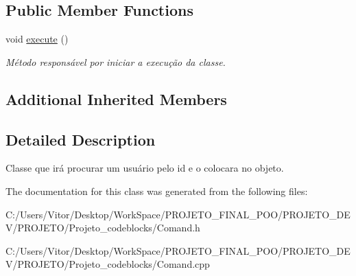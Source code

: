 \subsection*{Public Member Functions}
\begin{DoxyCompactItemize}
\item 
\hypertarget{class_command_find_user_a5ec31dbc1a789b3df354bf05f8cca046}{void \hyperlink{class_command_find_user_a5ec31dbc1a789b3df354bf05f8cca046}{execute} ()}\label{class_command_find_user_a5ec31dbc1a789b3df354bf05f8cca046}

\begin{DoxyCompactList}\small\item\em Método responsável por iniciar a execução da classe. \end{DoxyCompactList}\end{DoxyCompactItemize}
\subsection*{Additional Inherited Members}


\subsection{Detailed Description}
Classe que irá procurar um usuário pelo id e o colocara no objeto. 

The documentation for this class was generated from the following files\-:\begin{DoxyCompactItemize}
\item 
C\-:/\-Users/\-Vitor/\-Desktop/\-Work\-Space/\-P\-R\-O\-J\-E\-T\-O\-\_\-\-F\-I\-N\-A\-L\-\_\-\-P\-O\-O/\-P\-R\-O\-J\-E\-T\-O\-\_\-\-D\-E\-V/\-P\-R\-O\-J\-E\-T\-O/\-Projeto\-\_\-codeblocks/Comand.\-h\item 
C\-:/\-Users/\-Vitor/\-Desktop/\-Work\-Space/\-P\-R\-O\-J\-E\-T\-O\-\_\-\-F\-I\-N\-A\-L\-\_\-\-P\-O\-O/\-P\-R\-O\-J\-E\-T\-O\-\_\-\-D\-E\-V/\-P\-R\-O\-J\-E\-T\-O/\-Projeto\-\_\-codeblocks/Comand.\-cpp\end{DoxyCompactItemize}

